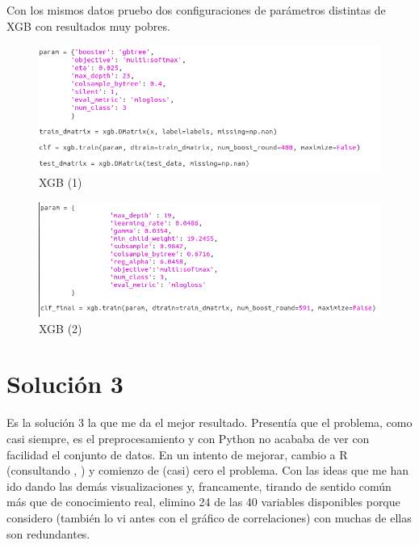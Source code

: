 Con los mismos datos pruebo dos configuraciones de parámetros distintas de XGB con resultados muy pobres.

\begin{figure}[H] %
	\centering
	\includegraphics[scale=0.5]{xgb2.png}  %
	\caption{XGB (1)} 
	\label{fig:xgb2}
\end{figure}

\begin{figure}[H] %
	\centering
	\includegraphics[scale=0.5]{xgb3.png}  %
	\caption{XGB (2)} 
	\label{fig:xgb3}
\end{figure}

\newpage

\section{Solución 3}

Es la solución 3 la que me da el mejor resultado. Presentía que el problema, como casi siempre, es el preprocesamiento y con Python no acababa de ver con facilidad el conjunto de datos. En un intento de mejorar, cambio a R (consultando \cite{r2}, \cite{r1}) y comienzo de (casi) cero el problema. Con las ideas que me han ido dando las demás visualizaciones y, francamente, tirando de sentido común más que de conocimiento real, elimino 24 de las 40 variables disponibles porque considero (también lo vi antes con el gráfico de correlaciones) con muchas de ellas son redundantes. 

